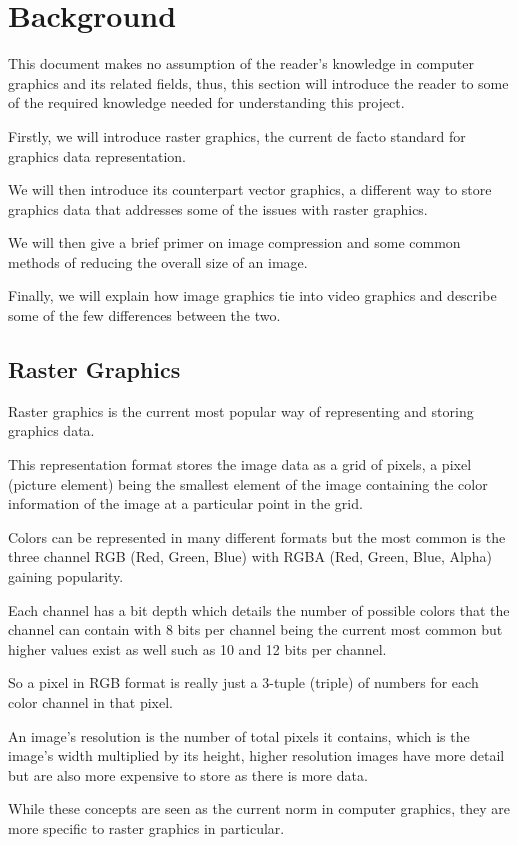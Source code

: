 \documentclass[12pt]{article}
\newcommand{\sentence}{} %
\begin{document}
    \pagebreak


    \section{Background}\label{sec:background}

    \tab
    This document makes no assumption of the reader's knowledge in computer graphics and its related fields,
    thus, this section will introduce the reader to some of the required knowledge needed for understanding this
    project.
    \sentence
    Firstly, we will introduce raster graphics, the current de facto standard for graphics data representation.
    \sentence
    We will then introduce its counterpart vector graphics, a different way to store graphics data that addresses
    some of the issues with raster graphics.
    \sentence
    We will then give a brief primer on image compression and some common methods of reducing the overall size
    of an image.
    \sentence
    Finally, we will explain how image graphics tie into video graphics and describe some of the few differences
    between the two.

    \subsection{Raster Graphics}\label{subsec:raster-graphics}

    \tab
    Raster graphics is the current most popular way of representing and storing graphics data.
    \sentence
    This representation format stores the image data as a grid of pixels, a pixel (picture element) being the
    smallest element of the image containing the color information of the image at a particular point in the grid.
    \sentence
    Colors can be represented in many different formats but the most common is the three channel RGB (Red, Green, Blue)
    with RGBA (Red, Green, Blue, Alpha) gaining popularity.
    \sentence
    Each channel has a bit depth which details the number of possible colors that the channel can contain with 8 bits
    per channel being the current most common but higher values exist as well such as 10 and 12 bits per channel.
    \sentence
    So a pixel in RGB format is really just a 3-tuple (triple) of numbers for each color channel in that pixel.
    \sentence
    An image's resolution is the number of total pixels it contains, which is the image's width multiplied by its
    height, higher resolution images have more detail but are also more expensive to store as there is more data.
    \sentence
    While these concepts are seen as the current norm in computer graphics, they are more specific to raster graphics
    in particular.
    \sentence
\end{document}
